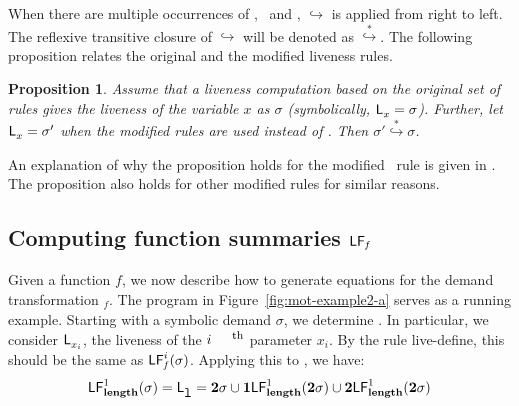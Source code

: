 \documentclass[9pt]{sigplanconf}
\newtheorem{proposition}[theorem]{Proposition}
\begin{document}
When   there  are   multiple   occurrences  of   \bcar,
\bcdr\  and \clazy,  $\hookrightarrow$ is  applied from
right  to left.   The reflexive  transitive closure  of
$\hookrightarrow$      will      be     denoted      as
$\stackrel{*}{\hookrightarrow}$.      The     following
proposition  relates  the  original  and  the  modified
liveness rules. 
\begin{proposition}
Assume  that  a  liveness   computation  based  on  the
original  set  of  rules  gives  the  liveness  of  the
variable  $x$   as $\sigma$
(symbolically,  $\mathsf{L}_{{x}}^{}=  \sigma$).  Further,  let
$\mathsf{L}_{{x}}^{}= \sigma'$ when the modified rules are used
instead      of      \Lfunonly.      Then      $\sigma'
\stackrel{*}{\hookrightarrow} \sigma$.
\end{proposition}

An  explanation of  why the  proposition holds  for the
modified  \CONS\ rule  is  given in  \cite{asati14lgc}.
The proposition also holds for other modified rules for
similar reasons.


\subsection{Computing function summaries $\mathsf{LF}_{\mathit f}$}
Given a  function $\mathit{f}$, we now  describe how to
generate  equations   for  the   demand  transformation
\Lfonly$_\mathit{f}$.        The       program       in
Figure~\ref{fig:mot-example2-a}   serves  as   a  running
example.  Starting with a  symbolic demand $\sigma$, we
determine  .   In
particular, we  consider $\mathsf{L}_{{x_i}}^{}$,  the liveness
of the $i^{\mbox{\footnotesize th}}$ parameter $x_i$.   By   the   rule   {\sc
  live-define},   this   should    be   the   same   as
$\mathsf{LF}_{\mathit f}^{i}( {\mathit \sigma})$. Applying this to \length, we have:
$$
 \mathsf{LF}_{\mathit {\mathbf{length}}}^{1}( {\mathit \sigma}) = \mathsf{L}_{{\mbox{\tt l}}}^{} = {\mathbf{2}}\sigma \cup \mathbf{1}\mathsf{LF}_{\mathit {\mathbf{length}}}^{1}( {\mathit {{\mathbf{2}}}\sigma})
  \cup {\mathbf{2}}\mathsf{LF}_{\mathit {\mathbf{length}}}^{1}( {\mathit {{\mathbf{2}}}\sigma})
$$
\end{document}
